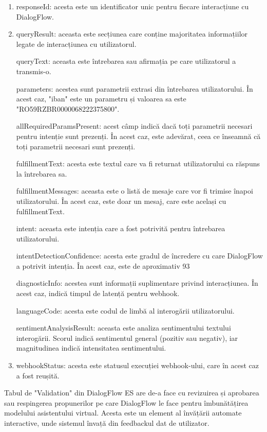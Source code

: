 \begin{enumerate}
    \item responseId: acesta este un identificator unic pentru fiecare interacțiune cu DialogFlow.

    \item queryResult: aceasta este secțiunea care conține majoritatea informațiilor legate de interacțiunea cu utilizatorul.
    
    \subitem queryText: aceasta este întrebarea sau afirmația pe care utilizatorul a transmis-o.
    
    \subitem parameters: acestea sunt parametrii extrasi din întrebarea utilizatorului. În acest caz, "iban" este un parametru și valoarea sa este "RO59RZBR0000068222375800".
    
    \subitem allRequiredParamsPresent: acest câmp indică dacă toți parametrii necesari pentru intenție sunt prezenți. În acest caz, este adevărat, ceea ce înseamnă că toți parametrii necesari sunt prezenți.
    
    \subitem fulfillmentText: acesta este textul care va fi returnat utilizatorului ca răspuns la întrebarea sa.
    
    \subitem fulfillmentMessages: aceasta este o listă de mesaje care vor fi trimise înapoi utilizatorului. În acest caz, este doar un mesaj, care este același cu fulfillmentText.
    
    \subitem intent: aceasta este intenția care a fost potrivită pentru întrebarea utilizatorului.
    
    \subitem intentDetectionConfidence: acesta este gradul de încredere cu care DialogFlow a potrivit intenția. În acest caz, este de aproximativ 93%
    
    \subitem diagnosticInfo: acestea sunt informații suplimentare privind interacțiunea. În acest caz, indică timpul de latență pentru webhook.
    
    \subitem languageCode: acesta este codul de limbă al interogării utilizatorului.
    
    \subitem sentimentAnalysisResult: aceasta este analiza sentimentului textului interogării. Scorul indică sentimentul general (pozitiv sau negativ), iar magnitudinea indică intensitatea sentimentului.
    
    \item webhookStatus: acesta este statusul execuției webhook-ului, care în acest caz a fost reușită.
\end{enumerate}

Tabul de "Validation" din DialogFlow ES are de-a face cu revizuirea și aprobarea sau respingerea propunerilor pe care DialogFlow le face pentru îmbunătățirea modelului asistentului virtual. Acesta este un element al învățării automate interactive, unde sistemul învață din feedbackul dat de utilizator.

